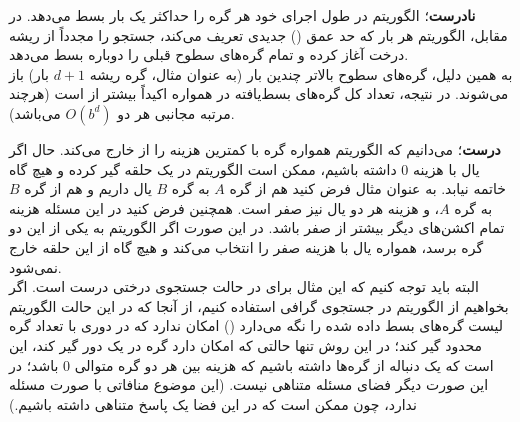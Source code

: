 \begin{ابجد}
\item \textbf{نادرست}؛ الگوریتم  در طول اجرای خود هر گره را حداکثر یک بار بسط می‌دهد. در مقابل، الگوریتم  هر بار که حد عمق () جدیدی تعریف می‌کند، جستجو را مجدداً از ریشه درخت آغاز کرده و تمام گره‌های سطوح قبلی را دوباره بسط می‌دهد. \\
به همین دلیل، گره‌های سطوح بالاتر چندین بار (به عنوان مثال، گره ریشه $d+1$ بار) باز می‌شوند. در نتیجه، تعداد کل گره‌های بسط‌یافته در  همواره اکیداً بیشتر از  است (هرچند مرتبه مجانبی هر دو $O(b^d)$ می‌باشد).

\item \textbf{درست}؛ می‌دانیم که الگوریتم  همواره گره با کمترین هزینه را از  خارج می‌کند. حال اگر یال با هزینه 0 داشته باشیم، ممکن است الگوریتم در یک حلقه گیر کرده و هیچ گاه خاتمه نیابد. به عنوان مثال فرض کنید هم از گره $A$ به گره $B$ یال داریم و هم از گره $B$ به گره $A$، و هزینه هر دو یال نیز صفر است. همچنین فرض کنید در این مسئله هزینه تمام اکشن‌های دیگر بیشتر از صفر باشد. در این صورت اگر الگوریتم به یکی از این دو گره برسد، همواره یال با هزینه صفر را انتخاب می‌کند و هیچ گاه از این حلقه خارج نمی‌شود. \\
البته باید توجه کنیم که این مثال برای  در حالت جستجوی درختی درست است. اگر بخواهیم از الگوریتم در جستجوی گرافی استفاده کنیم، از آنجا که در این حالت الگوریتم لیست گره‌های بسط داده شده را نگه می‌دارد () امکان ندارد که در دوری با تعداد گره محدود گیر کند؛ در این روش تنها حالتی که امکان دارد گره در یک دور گیر کند، این است که یک دنباله از گره‌ها داشته باشیم که هزینه بین هر دو گره متوالی 0 باشد؛ در این صورت دیگر فضای مسئله متناهی نیست. (این موضوع منافاتی با صورت مسئله ندارد، چون ممکن است که در این فضا یک پاسخ متناهی داشته باشیم.)


\end{ابجد}
